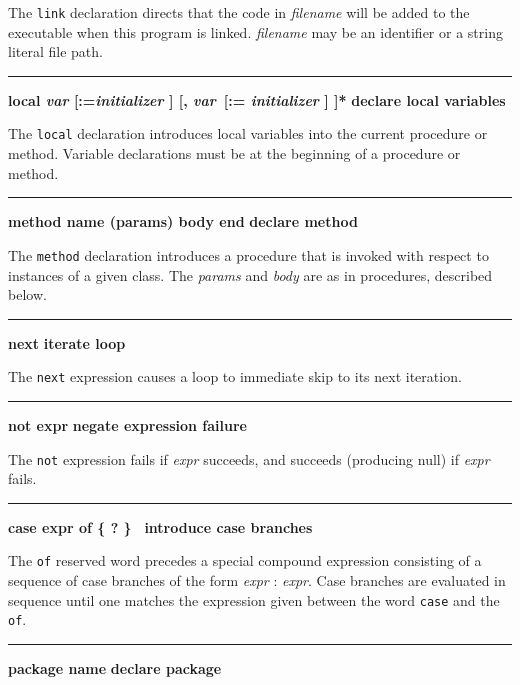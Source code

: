 \noindent
The \texttt{link} declaration directs that the code in
\textit{filename} will be added to the executable when this program is
linked. \textit{filename} may be an identifier or a string literal file
path.

\bigskip\hrule\vspace{0.1cm}
\noindent
{\bf \textbf{local} \textit{var} [:=\textit{initializer} ] [, \textit{var}\ [:=\textit{ initializer} ] ]* } \hfill {\bf declare local variables}

\noindent
{}The \texttt{local} declaration introduces local
variables into the current procedure or method.
Variable declarations must be at the beginning of a
procedure or method.

\bigskip\hrule\vspace{0.1cm}
\noindent
{\bf method name (params) body end } \hfill {\bf declare method}

\noindent
{}The \texttt{method} declaration introduces a procedure
that is invoked with respect to instances of
a given class. The \textit{params} and \textit{body}
are as in procedures, described below.

\bigskip\hrule\vspace{0.1cm}
\noindent
{\bf next } \hfill {\bf iterate loop}

\noindent
{}The \texttt{next} expression causes a loop to
immediate skip to its next iteration.

\bigskip\hrule\vspace{0.1cm}
\noindent
{\bf not expr } \hfill {\bf negate expression failure}

\noindent
{}The \texttt{not} expression fails if \textit{expr} succeeds,
and succeeds (producing null) if \textit{expr} fails.

\bigskip\hrule\vspace{0.1cm}
\noindent
{\bf case expr of \{ ? \}\ } \hfill {\bf introduce case branches}

\noindent
{}The \texttt{of} reserved word precedes a special compound
expression consisting of a sequence of case branches of the form
\textit{expr} : \textit{expr}. Case branches are evaluated in sequence
until one matches the expression given between the word
\texttt{case} and the \texttt{of}.

\bigskip\hrule\vspace{0.1cm}
\noindent
{\bf package name } \hfill {\bf declare package}

